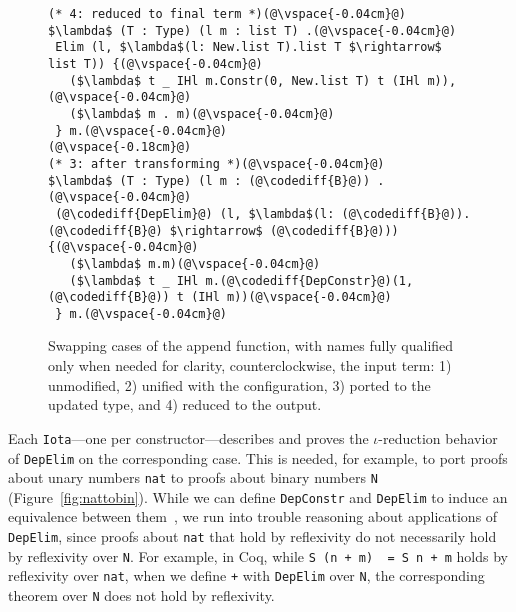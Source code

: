 \begin{figure*}
\begin{minipage}{0.49\textwidth}
\begin{lstlisting}
(* 4: reduced to final term *)(@\vspace{-0.04cm}@)
$\lambda$ (T : Type) (l m : list T) .(@\vspace{-0.04cm}@)
 Elim (l, $\lambda$(l: New.list T).list T $\rightarrow$ list T)) {(@\vspace{-0.04cm}@)
   ($\lambda$ t _ IHl m.Constr(0, New.list T) t (IHl m)),(@\vspace{-0.04cm}@)
   ($\lambda$ m . m)(@\vspace{-0.04cm}@)
 } m.(@\vspace{-0.04cm}@)
(@\vspace{-0.18cm}@)
(* 3: after transforming *)(@\vspace{-0.04cm}@)
$\lambda$ (T : Type) (l m : (@\codediff{B}@)) .(@\vspace{-0.04cm}@)
 (@\codediff{DepElim}@) (l, $\lambda$(l: (@\codediff{B}@)).(@\codediff{B}@) $\rightarrow$ (@\codediff{B}@))) {(@\vspace{-0.04cm}@)
   ($\lambda$ m.m)(@\vspace{-0.04cm}@)
   ($\lambda$ t _ IHl m.(@\codediff{DepConstr}@)(1, (@\codediff{B}@)) t (IHl m))(@\vspace{-0.04cm}@)
 } m.(@\vspace{-0.04cm}@)
\end{lstlisting}
\end{minipage}
\vspace{-0.4cm}
\caption{Swapping cases of the append function, with names fully qualified only when needed for clarity, counterclockwise, the input term: 1) unmodified, 2) unified with the configuration, 3) ported to the updated type, and 4) reduced to the output.}
\label{fig:appswap1}
\end{figure*}

Each \lstinline{Iota}---one per constructor---describes and proves the $\iota$-reduction behavior
of \lstinline{DepElim} on the corresponding case.
This is needed, for example, to port proofs about unary numbers \lstinline{nat} to
proofs about binary numbers \lstinline{N} (Figure~\ref{fig:nattobin}).
While we can define \lstinline{DepConstr} and \lstinline{DepElim} to induce an equivalence
between them~, %
we run into trouble reasoning about applications of \lstinline{DepElim},
since proofs about \lstinline{nat} that hold by reflexivity do not necessarily hold by reflexivity over \lstinline{N}. 
For example, in Coq, while \lstinline{S (n + m)  = S n + m} holds by reflexivity over \lstinline{nat},
when we define \lstinline{+} with \lstinline{DepElim} over \lstinline{N},
the corresponding theorem over \lstinline{N} does not hold by reflexivity.

